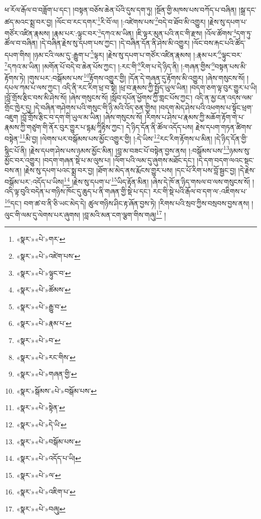 ཕ་རོལ་རྒོལ་བ་བཟློག་པ་དང་། །བསྟན་བཅོས་ཆེན་པོའི་དུས་དག་ཏུ། །སྔོན་གྱི་མཁས་པས་བཀོད་པ་བཞིན། །སྒྲ་དང་ཚད་མའང་སྨྲ་བར་བྱ། །ལོང་བ་རང་དགར་\footnote{«སྣར་»«པེ་»གར་}རི་བོ་ལ། །:འཛེགས་པས་\footnote{«སྣར་»«པེ་»འཛེག་པས་}བདེ་བ་ཐོབ་མི་འགྱུར། །རྗེས་སུ་དཔག་པ་གཙོར་འཛིན་རྣམས། །རྣམ་པར་:ལྟུང་བར་\footnote{«སྣར་»«པེ་»ལྟུང་བ་}དཀའ་མ་ཡིན། །ཇི་ལྟར་མུན་པའི་ནང་གི་རྫས། །འོལ་ཚོགས་\footnote{«སྣར་»«པེ་»ཚོམས་}དག་ཏུ་ཚོལ་བ་བཞིན། །དེ་བཞིན་རྗེས་སུ་དཔག་པས་ཀྱང་། །དེ་བཞིན་དོན་ནི་ཤེས་མི་འགྱུར། །ལོང་བས་རྐང་པའི་ཚོད་དཔག་གིས། །ཉམ་ངའི་ལམ་དུ་:རྒྱུག་པ་\footnote{«སྣར་»«པེ་»རྒྱུ་བ་}ལྟར། །རྗེས་སུ་དཔག་པ་གཙོར་འཛིན་རྣམས། །:རྣམ་པར་\footnote{«སྣར་»«པེ་»རྣམ་པ་}ལྟུང་བར་\footnote{«སྣར་»«པེ་»བ་}དཀའ་མ་ཡིན། །མགོན་པོ་བདེ་བ་ཆེན་པོས་ཀྱང་། །:རང་གི་\footnote{«སྣར་»«པེ་»རང་གིས་}རིག་པ་དེ་ཉིད་ནི། །:གཞན་གྱིས་\footnote{«སྣར་»«པེ་»གཞན་གྱི་}བསྟན་པས་མི་རྟོགས་ཏེ། །གུས་པར་:བསྒོམས་པས་\footnote{«སྣར་»སྒོམས་«པེ་»བསྒོམ་པས་}རྟོགས་འགྱུར་གྱི། །དོན་དེ་གཞན་དུ་རྟོགས་མི་འགྱུར། །ཞེས་གསུངས་སོ། །དཔལ་ཀམ་པ་ལས་ཀྱང་། འདི་ནི་རང་རིག་ཕྲ་བ་སྟེ། །ཕྲ་བ་རྣམས་ཀྱི་སྤྱོད་ཡུལ་ཡིན། །བདག་ཅག་ལྟ་བུར་གྱུར་པ་ཡི། །བློ་གྲོས་རྩིང་བས་མི་ཤེས་སོ། །ཞེས་གསུངས་སོ། །སློབ་དཔོན་ཕྱོགས་ཀྱི་གླང་པོས་ཀྱང་། འདི་ན་མྱ་ངན་འདས་ལམ་གྲོང་ཁྱེར་དུ། །དེ་བཞིན་གཤེགས་པའི་གསུང་གི་ཉི་མའི་འོད་ཅན་གྱིས། །བདག་མེད་ཤེས་པའི་འཕགས་པ་སྟོང་ཕྲག་འཇུག །བློ་གྲོས་རྩིང་བ་དག་གི་ཡུལ་མ་ཡིན། །ཞེས་གསུངས་སོ། །རིགས་པ་ཤེས་པ་རྣམས་ཀྱི་མཆོག་རྟོག་གེ་པ་རྣམས་ཀྱི་གཙུག་གི་ནོར་བུར་གྱུར་པ་དྷརྨ་ཀཱིརྟིས་ཀྱང་། དེ་ཉིད་དོན་ནི་ཚོལ་འདོད་པས། རྗེས་དཔག་གཏན་ཚིགས་བསྟེན་\footnote{«སྣར་»«པེ་»སྟེན་}མི་བྱ། །ལེགས་པར་བསྒོམས་པས་མྱོང་འགྱུར་གྱི། །:དེ་ཡིས་\footnote{«སྣར་»«པེ་»དེ་ཡི་}རང་རིག་རྟོགས་པ་མིན། །དེ་ཉིད་དོན་གྱི་སྙིང་པོ་ནི། །རྗེས་དཔག་ཤེས་པས་ཉམས་མྱོང་མིན། །བླ་མ་བཟང་པོ་བསྟེན་བྱས་ནས། །:བསྒོམས་པས་\footnote{«སྣར་»«པེ་»བསྒོམ་པས་}ཉམས་སུ་མྱོང་བར་འགྱུར། །བདག་གཞན་སྡེ་པ་མ་ལུས་པ། །ལོག་པའི་ལམ་དུ་ཞུགས་མཐོང་དང་། །དེ་དག་བདག་ལའང་སྡང་བས་ན། །རྗེས་སུ་དཔག་པའང་སྨྲ་བར་བྱ། །ཐོག་མ་མེད་ནས་རྨོངས་གྱུར་པས། །དང་པོ་རིག་པས་བློ་སྦྱང་བྱ། །དེ་རྗེས་བསྒོམ་པར་:འདོད་པ་ཡིས།\footnote{«སྣར་»«པེ་»འདོད་པ་ཡི།} །རྗེས་སུ་དཔག་པ་\footnote{«སྣར་»«པེ་»ལ་}ཡིད་རྟོན་མིན། །ཞེས་དེ་ཁོ་ན་ཉིད་གསལ་བ་ལས་གསུངས་སོ། །འདི་ལྟ་བུའི་བདེན་པ་གཉིས་ཁོང་དུ་ཆུད་པ་ནི་གཞན་གྱི་སྡེ་པ་དང་། རང་གི་སྡེ་པའི་རྒོལ་བ་དག་ལ་:འཇིགས་པ་\footnote{«སྣར་»«པེ་»འཇིག་པ་}དང་། བག་ཚ་བ་ནི་ཅི་ཡང་མེད་དེ། ཚུལ་གཉིས་ཤིང་རྟ་ཞོན་བྱས་ཏེ། །རིགས་པའི་སྲབ་ཀྱིས་བསྲབས་བྱས་ནས། །ལུང་གི་ལམ་དུ་ལེགས་པར་ཞུགས། །བླ་མའི་མན་ངག་ལྕག་གིས་གཞུ།\footnote{«སྣར་»«པེ་»བཞུ།} །

